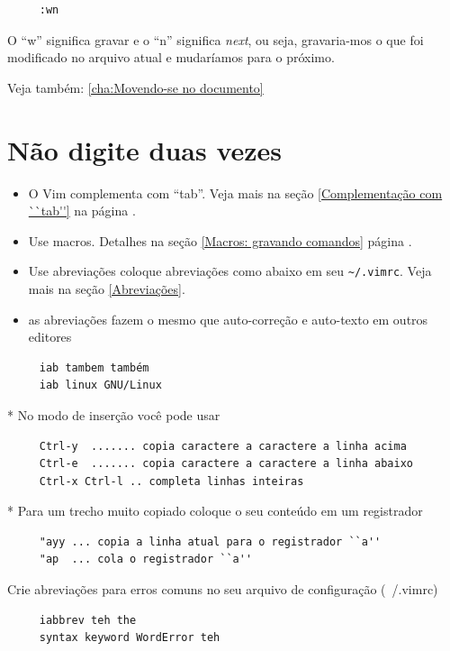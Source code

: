 \documentclass[10pt,a4paper,openany]{book}
\begin{document}
\begin{verbatim}
     :wn
\end{verbatim}

O ``w'' significa gravar e o ``n'' significa {\em next}, ou seja, gravaria-mos
o que foi modificado no arquivo atual e mudaríamos para o próximo.

Veja também: \ref{cha:Movendo-se no documento}

\section{Não digite duas vezes}
\label{Não digite duas vezes}

\begin{itemize}
\item O Vim complementa com ``tab''. Veja mais na seção \ref{Complementação com ``tab''} na página \pageref{Complementação com ``tab''}.
\item Use macros. Detalhes na seção \ref{Macros: gravando comandos}
página \pageref{Macros: gravando comandos}.
\item Use abreviações coloque abreviações como abaixo em seu \verb|~/.vimrc|. Veja mais na seção \ref{Abreviações}.
\item as abreviações fazem o mesmo que auto-correção e auto-texto em outros editores
\end{itemize}

\begin{verbatim}
     iab tambem também
     iab linux GNU/Linux
\end{verbatim}



* No modo de inserção você pode usar

\begin{verbatim}
     Ctrl-y  ....... copia caractere a caractere a linha acima
     Ctrl-e  ....... copia caractere a caractere a linha abaixo
     Ctrl-x Ctrl-l .. completa linhas inteiras
\end{verbatim}

* Para um trecho muito copiado coloque o seu conteúdo em um registrador

\begin{verbatim}
     "ayy ... copia a linha atual para o registrador ``a''
     "ap  ... cola o registrador ``a''
\end{verbatim}

Crie abreviações para erros comuns no seu arquivo de configuração (~/.vimrc)

\begin{verbatim}
     iabbrev teh the
     syntax keyword WordError teh
\end{verbatim}
\end{document}
